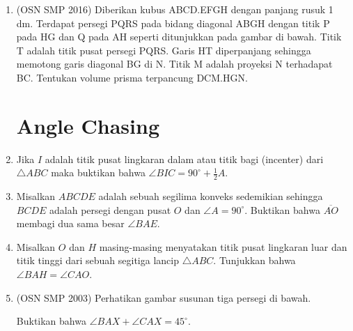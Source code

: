 \documentclass[12pt]{scrartcl}
\begin{document}
\begin{enumerate}
    \item (OSN SMP 2016) Diberikan kubus ABCD.EFGH dengan panjang rusuk 1 dm. Terdapat persegi PQRS pada bidang diagonal ABGH dengan titik P pada HG dan Q pada AH seperti ditunjukkan pada gambar di bawah. Titik T adalah titik pusat persegi PQRS. Garis HT diperpanjang sehingga memotong garis diagonal BG di N. Titik M adalah proyeksi N terhadapat BC. Tentukan volume prisma terpancung DCM.HGN.
    
\section{Angle Chasing}
    \item Jika $I$ adalah titik pusat lingkaran dalam atau titik bagi (incenter) dari $\triangle ABC$ maka buktikan bahwa
        $\angle BIC = 90^\circ + \frac{1}{2}A.$

    \item Misalkan $ABCDE$ adalah sebuah segilima konveks sedemikian sehingga $BCDE$ adalah persegi dengan pusat $O$ dan $\angle A = 90^\circ$. Buktikan bahwa $\overline{AO}$ membagi dua sama besar $\angle BAE$.

    \item Misalkan $O$ dan $H$ masing-masing menyatakan titik pusat lingkaran luar dan titik tinggi dari sebuah segitiga lancip $\triangle ABC$. Tunjukkan bahwa $\angle BAH = \angle CAO$.

    \item (OSN SMP 2003) Perhatikan gambar susunan tiga persegi di bawah. 
    
    Buktikan bahwa $\angle BAX+\angle CAX=45^{\circ}$.
    


\end{enumerate}
\end{document}
